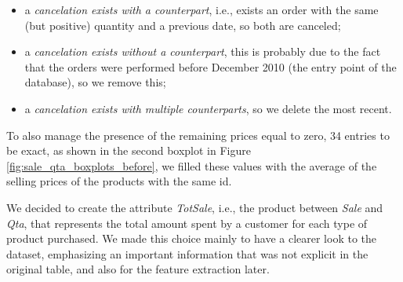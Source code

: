\begin{itemize}
\item a \emph{cancelation exists with a counterpart}, i.e., exists an order with the same (but positive) quantity and a previous date, so both are canceled;
\item a \emph{cancelation exists without a counterpart}, this is probably due to the fact that the orders were performed before December 2010 (the entry point of the database), so we remove this;
\item a \emph{cancelation exists with multiple counterparts}, so we delete the most recent.
\end{itemize}

To also manage the presence of the remaining prices equal to zero, 34 entries to be exact, as shown in the second boxplot in Figure \ref{fig:sale_qta_boxplots_before}, we filled these values with the average of the selling prices of the products with the same id.

We decided to create the attribute \emph{TotSale}, i.e., the product between \emph{Sale} and \emph{Qta}, that represents the total amount spent by a customer for each type of product purchased. We made this choice mainly to have a clearer look to the dataset, emphasizing an important information that was not explicit in the original table, and also for the feature extraction later.

